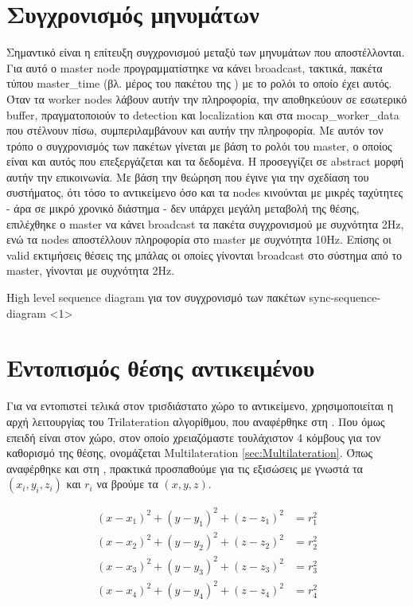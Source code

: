 \section{Συγχρονισμός μηνυμάτων}
Σημαντικό είναι η επίτευξη συγχρονισμού μεταξύ των μηνυμάτων που α\-πο\-στέ\-λλο\-νται. Για αυτό ο master node προγραμματίστηκε να κάνει broadcast, τακτικά, πακέτα τύπου master\_time (βλ. μέρος του πακέτου της ) με το ρολόι το οποίο έχει αυτός. Όταν τα worker nodes λάβουν αυτήν την πληροφορία, την αποθηκεύουν σε εσωτερικό buffer, πραγματοποιούν το detection και localization και στα mocap\_worker\_data που στέλνουν πίσω, συμπεριλαμβάνουν και αυτήν την πληροφορία. Με αυτόν τον τρόπο ο συγχρονισμός των πακέτων γίνεται με βάση το ρολόι του master, ο οποίος είναι και αυτός που επεξεργάζεται και τα δεδομένα. Η  προσεγγίζει σε abstract μορφή αυτήν την επικοινωνία. Με βάση την θεώρηση που έγινε για την σχεδίαση του συστήματος, ότι τόσο το αντικείμενο όσο και τα nodes κινούνται με μικρές ταχύτητες - άρα σε μικρό χρονικό διάστημα - δεν υπάρχει μεγάλη μεταβολή της θέσης, επιλέχθηκε ο master να κάνει broadcast τα πακέτα συγχρονισμού με συχνότητα 2Hz, ενώ τα nodes αποστέλλουν πληροφορία στο master με συχνότητα 10Hz. Επίσης οι valid εκτιμήσεις θέσεις της μπάλας οι οποίες γίνονται broadcast στο σύστημα από το master, γίνονται με συχνότητα 2Hz.  

{High level sequence diagram για τον συγχρονισμό των πακέτων} %
{sync-sequence-diagram} %
<1>


\section{Εντοπισμός θέσης αντικειμένου}\label{sec:implementation-obj-mult}
Για να εντοπιστεί τελικά στον τρισδιάστατο χώρο το αντικείμενο, χρησιμοποιείται η αρχή λειτουργίας του Trilateration αλγορίθμου, που αναφέρθηκε στη . Που όμως επειδή είναι στον  χώρο, στον οποίο χρειαζόμαστε τουλάχιστον 4 κόμβους για τον καθορισμό της θέσης, ονομάζεται Multilateration \ref{sec:Multilateration}. Όπως αναφέρθηκε και στη , πρακτικά προσπαθούμε για τις εξισώσεις  με γνωστά τα $(x_i, y_i, z_i)$ και $r_i$ να βρούμε τα $(x,y,z)$. 
 
\begin{align}
	(x-x_1)^2 + (y-y_1)^2 + (z-z_1)^2 &= r_1^2 \label{eq:multilateration-pha1} \\ 
	(x-x_2)^2 + (y-y_2)^2 + (z-z_2)^2 &= r_2^2 \nonumber \\
	(x-x_3)^2 + (y-y_3)^2 + (z-z_3)^2 &= r_3^2 \nonumber \\
	(x-x_4)^2 + (y-y_4)^2 + (z-z_4)^2 &= r_4^2 \nonumber 
\end{align}

